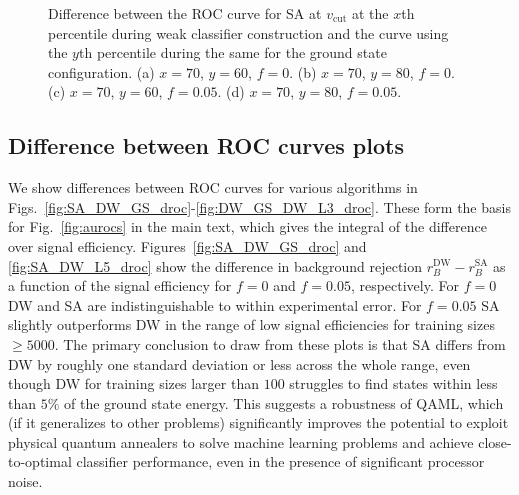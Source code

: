 \begin{figure}[h]
\hfill
\vspace{-5cm}
\vspace{-4cm}
\caption{Difference between the ROC curve for SA at $v_{\text{cut}}$ at the $x$th percentile during weak classifier construction and the curve using the $y$th percentile during the same for the ground state configuration. (a) $x=70$, $y=60$, $f=0$. (b) $x=70$, $y=80$, $f=0$. (c) $x=70$, $y=60$, $f=0.05$. (d) $x=70$, $y=80$, $f=0.05$.}
\label{fig:droc_vcut6070}
\end{figure}

\subsection{Difference between ROC curves plots}
\label{sec:ROC-diffs}
We show differences between ROC curves for various algorithms in Figs.~\ref{fig:SA_DW_GS_droc}-\ref{fig:DW_GS_DW_L3_droc}. These form the basis for Fig.~\ref{fig:aurocs} in the main text, which gives the integral of the difference over signal efficiency. Figures~\ref{fig:SA_DW_GS_droc} and \ref{fig:SA_DW_L5_droc} show the difference in background rejection $r_B^{\text{DW}}-r_B^{\text{SA}}$ as a function of the signal efficiency for $f=0$ and $f=0.05$, respectively. For $f=0$ DW and SA are indistinguishable to within experimental error. For $f=0.05$ SA slightly outperforms DW in the range of low signal efficiencies for training sizes $\geq 5000$. The primary conclusion to draw from these plots is that SA differs from DW by roughly one standard deviation or less across the whole range, even though DW for training sizes larger than $100$ struggles to find states within less than $5\%$ of the ground state energy. This suggests a robustness of QAML,
which (if it generalizes to other problems) significantly improves the potential to exploit physical quantum annealers to solve machine learning problems and achieve close-to-optimal classifier performance, even in the presence of significant processor noise.

